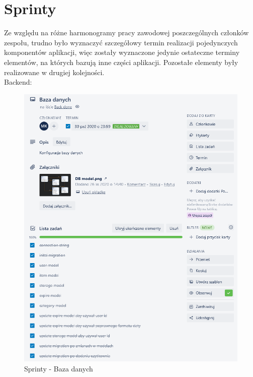 \documentclass[12pt,a4paper]{article}
\begin{document}
	\section{Sprinty}
		\indent Ze względu na różne harmonogramy pracy zawodowej poszczególnych członków zespołu, trudno było wyznaczyć szczegółowy termin realizacji pojedynczych komponentów aplikacji,
		więc zostały wyznaczone jedynie ostateczne terminy elementów, na których bazują inne części aplikacji. Pozostałe elementy były realizowane w drugiej kolejności.\\
		\indent Backend:
		\begin{figure}[H]
			\centering
			\includegraphics[width=\textwidth]{img/DBSprint.png}
			\caption{Sprinty - Baza danych}
			\label{fig:sprint-db}
		\end{figure}
\end{document}

